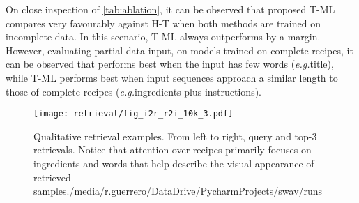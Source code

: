 \documentclass[sigconf,nonacm]{acmart}
\def\eg{\emph{e.g.}} \def\Eg{\emph{E.g.}}
\begin{document}
On close inspection of \autoref{tab:ablation}, it can be observed that proposed T-ML compares very favourably against H-T \cite{salvador2021} when both methods are trained on incomplete data. In this scenario, T-ML always outperforms \cite{salvador2021} by a margin. However, evaluating partial data input, on models trained on complete recipes, it can be observed that \cite{salvador2021} performs best when the input has few words (\eg title), while T-ML performs best when input sequences approach a similar length to those of complete recipes (\eg ingredients plus instructions).


\begin{figure}
\centering
\texttt{[image: retrieval/fig\_i2r\_r2i\_10k\_3.pdf]}
\caption{Qualitative retrieval examples. From left to right, query and top-3 retrievals. Notice that attention over recipes primarily focuses on ingredients and words that help describe the visual appearance of retrieved samples./media/r.guerrero/DataDrive/PycharmProjects/swav/runs}
\label{fig:i2r_r2i}
\vspace{-1em}
\end{figure}
\end{document}
